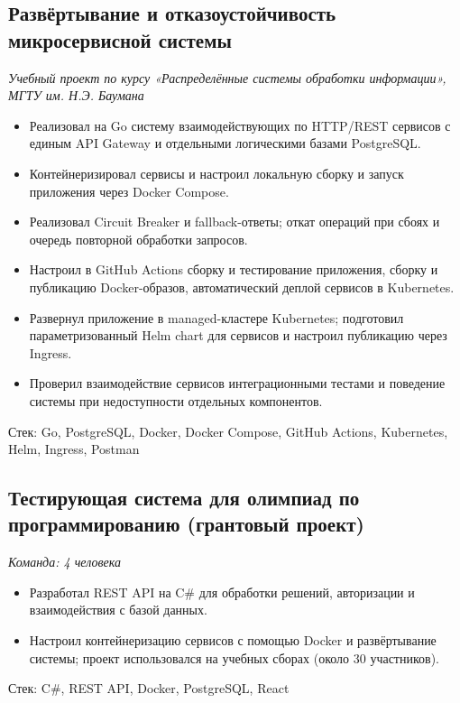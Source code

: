 \documentclass[10pt,a4paper]{article}
\newcommand{\jobmeta}[1]{{\small\color{midgray}\textit{#1}}\par\vspace{0.05em}}
\newcommand{\stackline}[1]{\par{\small\color{midgray}Стек: #1}\par}
\newcommand{\repoline}[1]{\par{\small\color{midgray}Репозиторий: #1}\par}
\begin{document}
\subsection*{Развёртывание и отказоустойчивость микросервисной системы}
\jobmeta{Учебный проект по курсу «Распределённые системы обработки информации», МГТУ им. Н.Э. Баумана}
\begin{itemize}
  \item Реализовал на Go систему взаимодействующих по HTTP/REST сервисов с единым API Gateway и отдельными логическими базами PostgreSQL.
  \item Контейнеризировал сервисы и настроил локальную сборку и запуск приложения через Docker Compose.
  \item Реализовал Circuit Breaker и fallback-ответы; откат операций при сбоях и очередь повторной обработки запросов.
  \item Настроил в GitHub Actions сборку и тестирование приложения, сборку и публикацию Docker-образов, автоматический деплой сервисов в Kubernetes.
  \item Развернул приложение в managed-кластере Kubernetes; подготовил параметризованный Helm chart для сервисов и настроил публикацию через Ingress.
  \item Проверил взаимодействие сервисов интеграционными тестами и поведение системы при недоступности отдельных компонентов.
\end{itemize}
\stackline{Go, PostgreSQL, Docker, Docker Compose, GitHub Actions, Kubernetes, Helm, Ingress, Postman}

\subsection*{Тестирующая система для олимпиад по программированию (грантовый проект)}
\jobmeta{Команда: 4 человека}
\begin{itemize}
  \item Разработал REST API на C\# для обработки решений, авторизации и взаимодействия с базой данных.
  \item Настроил контейнеризацию сервисов с помощью Docker и развёртывание системы; проект использовался на учебных сборах (около 30 участников).
\end{itemize}
\stackline{C\#, REST API, Docker, PostgreSQL, React}

\end{document}
